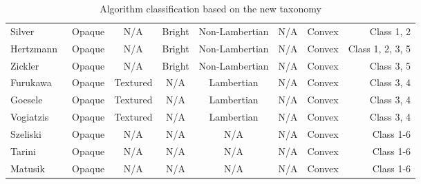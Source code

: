 \begin{sidewaystable}[h]
\begin{tabular}{l*{6}{c}r}
  Silver~\cite{silver1980determining} & Opaque & N/A & Bright & Non-Lambertian & N/A & Convex & Class 1, 2\\
  Hertzmann~\cite{hertzmann2005example} & Opaque & N/A & Bright & Non-Lambertian & N/A & Convex & Class 1, 2, 3, 5\\
  Zickler~\cite{zickler2002helmholtz} & Opaque & N/A & Bright & Non-Lambertian & N/A & Convex & Class 3, 5\\
  Furukawa~\cite{furukawa2010accurate} & Opaque & Textured & N/A & Lambertian & N/A & Convex & Class 3, 4\\
  Goesele~\cite{goesele2006multi} & Opaque & Textured & N/A & Lambertian & N/A & Convex & Class 3, 4\\
  Vogiatzis~\cite{vogiatzis2007multiview} & Opaque & Textured & N/A & Lambertian & N/A & Convex & Class 3, 4\\
  Szeliski~\cite{szeliski1993rapid} & Opaque & N/A & N/A & N/A & N/A & Convex & Class 1-6\\
  Tarini~\cite{tarini2002marching} & Opaque & N/A & N/A & N/A & N/A & Convex & Class 1-6\\
  Matusik~\cite{matusik2002efficient} & Opaque & N/A & N/A & N/A & N/A & Convex & Class 1-6\\
  \hline
  \end{tabular}
  \caption{Algorithm classification based on the new taxonomy}
  \label{tab:algo_taxo}
\end{sidewaystable}